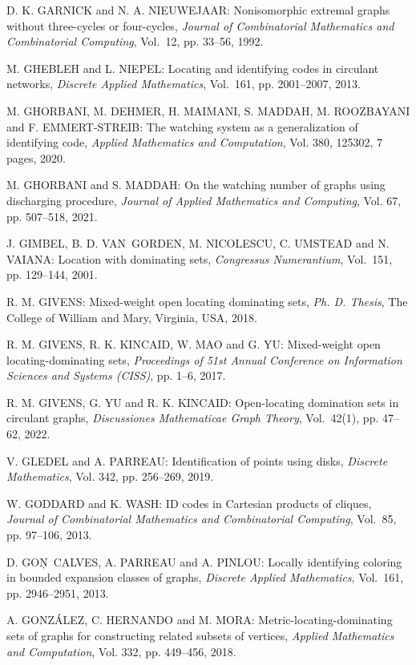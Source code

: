 \begin{thebibliography}{999}
D. K. GARNICK and N. A. NIEUWEJAAR: Nonisomorphic extremal graphs without three-cycles or four-cycles, {\it Journal of Combinatorial Mathematics and Combinatorial Computing}, Vol.~12, pp. 33--56, 1992.

M. GHEBLEH and L. NIEPEL: Locating and identifying codes in circulant networks, {\it Discrete Applied Mathematics}, Vol.~161, pp. 2001--2007, 2013.

M. GHORBANI, M. DEHMER, H. MAIMANI, S. MADDAH, M. ROOZ\-BAYANI and F. EMMERT-STREIB: The watching system as a generalization of identifying code, {\it Applied Mathematics and Computation}, Vol. 380, 125302, 7 pages, 2020.

M. GHORBANI and S. MADDAH: On the watching number of graphs using discharging procedure, {\it Journal of Applied Mathematics and Computing}, Vol. 67, pp. 507--518, 2021.

J. GIMBEL, B. D. VAN~GORDEN, M. NICOLESCU, C. UMSTEAD and N. VAIANA: Location with dominating sets, {\it Congressus Numerantium}, Vol.~151, pp. 129--144, 2001.

R. M. GIVENS: Mixed-weight open locating dominating sets, {\it Ph. D. Thesis}, The College of William and Mary, Virginia, USA, 2018.

R. M. GIVENS, R. K. KINCAID, W. MAO and G. YU: Mixed-weight open locating-dominating sets, {\it Proceedings of 51st Annual Conference on Information Sciences and Systems (CISS)}, pp. 1--6, 2017.

R. M. GIVENS, G. YU and R. K. KINCAID: Open-locating domination sets in circulant graphs, {\it Discussiones Mathematicae Graph Theory}, Vol.~42(1), pp. 47--62, 2022.

V. GLEDEL and A. PARREAU: Identification of points using disks, {\it Discrete Mathematics}, Vol. 342, pp. 256--269, 2019.

W. GODDARD and K. WASH: ID codes in Cartesian products of cliques, {\it Journal of Combinatorial Mathematics and Combinatorial Computing}, Vol.~85, pp. 97--106, 2013.

D. GON\c~CALVES, A. PARREAU and A. PINLOU: Locally identifying coloring in bounded expansion classes of graphs, {\it Discrete Applied Mathematics}, Vol.~161, pp. 2946--2951, 2013.

A. GONZ\'ALEZ, C. HERNANDO and  M. MORA: Metric-locating-dominating sets of graphs for constructing related subsets of vertices, {\it Applied Mathematics and Computation}, Vol. 332, pp. 449--456, 2018.


\end{thebibliography}
